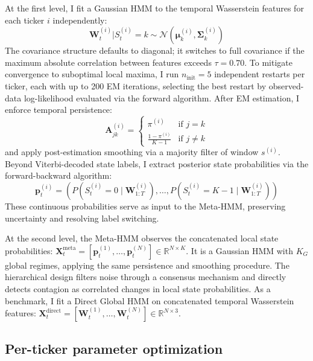 \documentclass{article}
\begin{document}
At the first level, I fit a Gaussian HMM to the temporal Wasserstein features
for each ticker $i$ independently:
\[
\mathbf{W}_t^{(i)} | S_t^{(i)} = k \sim \mathcal{N}(\boldsymbol{\mu}_k^{(i)},
\boldsymbol{\Sigma}_k^{(i)})
\]
The covariance structure defaults to diagonal; it switches to full covariance
if the maximum absolute correlation between features exceeds $\tau = 0.70$. To
mitigate convergence to suboptimal local maxima, I run $n_{\text{init}} = 5$
independent restarts per ticker, each with up to 200 EM iterations, selecting
the best restart by observed-data log-likelihood evaluated via the forward
algorithm. After EM estimation, I enforce temporal persistence:
\begin{equation}
\mathbf{A}_{jk}^{(i)} = \begin{cases}
\pi^{(i)} & \text{if } j = k \\
\frac{1 - \pi^{(i)}}{K-1} & \text{if } j \neq k
\end{cases}
\end{equation}
and apply post-estimation smoothing via a majority filter of window $s^{(i)}$.
Beyond Viterbi-decoded state labels, I extract posterior state probabilities
via the forward-backward algorithm:
\begin{equation}
\mathbf{p}_t^{(i)} = \left(P(S_t^{(i)} = 0 \mid \mathbf{W}_{1:T}^{(i)}),
\ldots, P(S_t^{(i)} = K-1 \mid \mathbf{W}_{1:T}^{(i)})\right)
\end{equation}
These continuous probabilities serve as input to the Meta-HMM, preserving
uncertainty and resolving label switching.

At the second level, the Meta-HMM observes the concatenated local state
probabilities: $\mathbf{X}_t^{\text{meta}} = [\mathbf{p}_t^{(1)}, \ldots,
\mathbf{p}_t^{(N)}] \in \mathbb{R}^{N \times K}$. It is a Gaussian HMM with
$K_G$ global regimes, applying the same persistence and smoothing procedure.
The hierarchical design filters noise through a consensus mechanism and directly
detects contagion as correlated changes in local state probabilities. As a
benchmark, I fit a Direct Global HMM on concatenated temporal Wasserstein
features: $\mathbf{X}_t^{\text{direct}} = [\mathbf{W}_t^{(1)}, \ldots,
\mathbf{W}_t^{(N)}] \in \mathbb{R}^{N \times 3}$.

\subsection{Per-ticker parameter optimization}
\label{sec:optimization}
\end{document}

